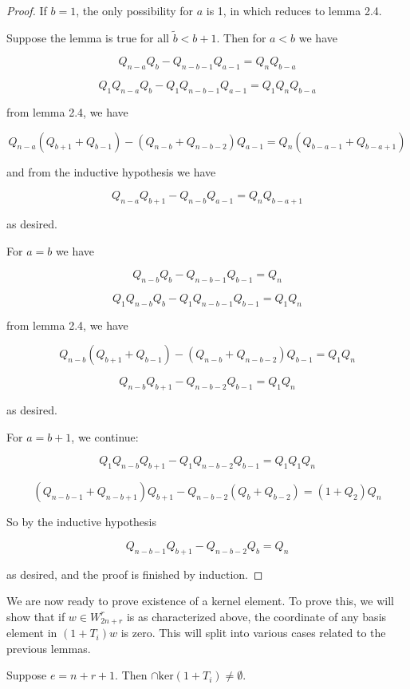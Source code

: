 \documentclass{amsart}
\begin{document}
\begin{proof}
	If $b=1$, the only possibility for $a$ is 1, in which reduces to lemma 2.4.
	
	Suppose the lemma is true for all $\tilde{b}<b+1$. Then for $a< b$ we have 
	
	$$Q_{n-a}Q_b -Q_{n-b-1}Q_{a-1}=Q_{n}Q_{b-a}$$
	
	$$Q_1Q_{n-a}Q_b-Q_1Q_{n-b-1}Q_{a-1}=Q_1Q_{n}Q_{b-a}$$
	
	from lemma 2.4, we have
	
	$$Q_{n-a}(Q_{b+1}+Q_{b-1})-(Q_{n-b}+Q_{n-b-2})Q_{a-1}=Q_{n}(Q_{b-a-1}+Q_{b-a+1})$$
	
	and from the inductive hypothesis we have
	
	$$Q_{n-a}Q_{b+1}-Q_{n-b}Q_{a-1}=Q_{n}Q_{b-a+1}$$
	
	as desired.
	
	For $a=b$ we have 
	
	$$Q_{n-b}Q_b -Q_{n-b-1}Q_{b-1}=Q_{n}$$
	
	$$Q_1Q_{n-b}Q_b-Q_1Q_{n-b-1}Q_{b-1}=Q_1Q_{n}$$
	
	from lemma 2.4, we have
	
	$$Q_{n-b}(Q_{b+1}+Q_{b-1})-(Q_{n-b}+Q_{n-b-2})Q_{b-1}=Q_1Q_{n}$$
	
	$$Q_{n-b}Q_{b+1}-Q_{n-b-2}Q_{b-1}=Q_1Q_{n}$$
	
	as desired.
	
	For $a=b+1$, we continue:
	
	$$Q_1Q_{n-b}Q_{b+1}-Q_1Q_{n-b-2}Q_{b-1}=Q_1Q_1Q_{n}$$
	
	$$(Q_{n-b-1}+Q_{n-b+1})Q_{b+1}-Q_{n-b-2}(Q_{b}+Q_{b-2})=(1+Q_2)Q_{n}$$
	
	So by the inductive hypothesis
	
	$$Q_{n-b-1}Q_{b+1}-Q_{n-b-2}Q_{b}=Q_{n}$$
	
	as desired, and the proof is finished by induction.
	
\end{proof}

\vspace{5mm}
We are now ready to prove existence of a kernel element. To prove this, we will show that if $w\in W_{2n+r}^r$ is as characterized above, the coordinate of any basis element in $(1+T_i)w$ is zero. This will split into various cases related to the previous lemmas.

\vspace{5mm}
\begin{proposition}
	Suppose $e=n+r+1$. Then $\cap\text{ker}(1+T_i)\not=\emptyset$.
\end{proposition}
\end{document}
